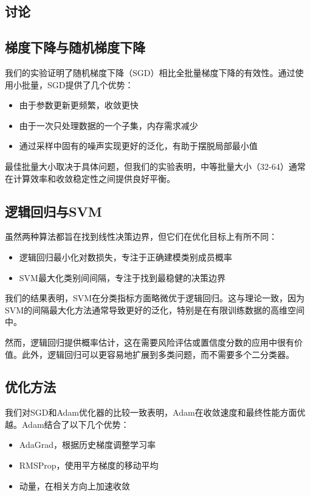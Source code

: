 \documentclass[journal, a4paper]{IEEEtran}
\begin{document}
\begin{CJK}{UTF8}{gbsn}
\section{讨论}

\subsection{梯度下降与随机梯度下降}
我们的实验证明了随机梯度下降（SGD）相比全批量梯度下降的有效性。通过使用小批量，SGD提供了几个优势：

\begin{itemize}
    \item 由于参数更新更频繁，收敛更快
    \item 由于一次只处理数据的一个子集，内存需求减少
    \item 通过采样中固有的噪声实现更好的泛化，有助于摆脱局部最小值
\end{itemize}

最佳批量大小取决于具体问题，但我们的实验表明，中等批量大小（32-64）通常在计算效率和收敛稳定性之间提供良好平衡。

\subsection{逻辑回归与SVM}
虽然两种算法都旨在找到线性决策边界，但它们在优化目标上有所不同：

\begin{itemize}
    \item 逻辑回归最小化对数损失，专注于正确建模类别成员概率
    \item SVM最大化类别间间隔，专注于找到最稳健的决策边界
\end{itemize}

我们的结果表明，SVM在分类指标方面略微优于逻辑回归。这与理论一致，因为SVM的间隔最大化方法通常导致更好的泛化，特别是在有限训练数据的高维空间中。

然而，逻辑回归提供概率估计，这在需要风险评估或置信度分数的应用中很有价值。此外，逻辑回归可以更容易地扩展到多类问题，而不需要多个二分类器。

\subsection{优化方法}
我们对SGD和Adam优化器的比较一致表明，Adam在收敛速度和最终性能方面优越。Adam结合了以下几个优势：

\begin{itemize}
    \item AdaGrad，根据历史梯度调整学习率
    \item RMSProp，使用平方梯度的移动平均
    \item 动量，在相关方向上加速收敛
\end{itemize}


\end{CJK}
\end{document}
